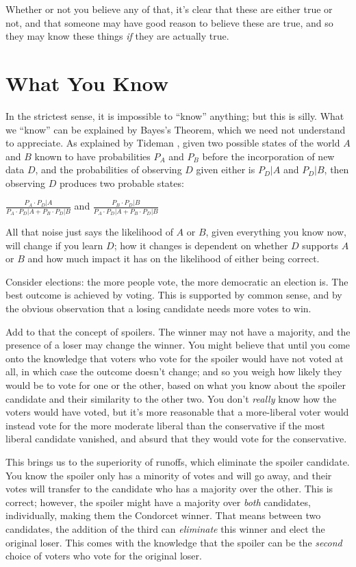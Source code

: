 Whether or not you believe any of that, it's clear that these are either true or not, and that someone may have good reason to believe these are true, and so they may know these things \textit{if} they are actually true.

\section{What You Know}

In the strictest sense, it is impossible to ``know'' anything; but this is silly.  What we ``know'' can be explained by Bayes's Theorem, which we need not understand to appreciate.  As explained by Tideman \autocite{Tideman2006}, given two possible states of the world $A$ and $B$ known to have probabilities $P_A$ and $P_B$ before the incorporation of new data $D$, and the probabilities of observing $D$ given either is $P_D|A$ and $P_D|B$, then observing $D$ produces two probable states:

\centerline{
$\frac{P_A\cdot P_D|A}{P_A\cdot P_D|A + P_B\cdot P_D|B}$ and $\frac{P_B\cdot P_D|B}{P_A\cdot P_D|A + P_B\cdot P_D|B}$
}

All that noise just says the likelihood of $A$ or $B$, given everything you know now, will change if you learn $D$; how it changes is dependent on whether $D$ supports $A$ or $B$ and how much impact it has on the likelihood of either being correct.

Consider elections:  the more people vote, the more democratic an election is.  The best outcome is achieved by voting.  This is supported by common sense, and by the obvious observation that a losing candidate needs more votes to win.

Add to that the concept of spoilers.  The winner may not have a majority, and the presence of a loser may change the winner.  You might believe that until you come onto the knowledge that voters who vote for the spoiler would have not voted at all, in which case the outcome doesn't change; and so you weigh how likely they would be to vote for one or the other, based on what you know about the spoiler candidate and their similarity to the other two.  You don't \textit{really} know how the voters would have voted, but it's more reasonable that a more-liberal voter would instead vote for the more moderate liberal than the conservative if the most liberal candidate vanished, and absurd that they would vote for the conservative.

This brings us to the superiority of runoffs, which eliminate the spoiler candidate.  You know the spoiler only has a minority of votes and will go away, and their votes will transfer to the candidate who has a majority over the other.  This is correct; however, the spoiler might have a majority over \textit{both} candidates, individually, making them the Condorcet winner.  That means between two candidates, the addition of the third can \textit{eliminate} this winner and elect the original loser.  This comes with the knowledge that the spoiler can be the \textit{second} choice of voters who vote for the original loser.

